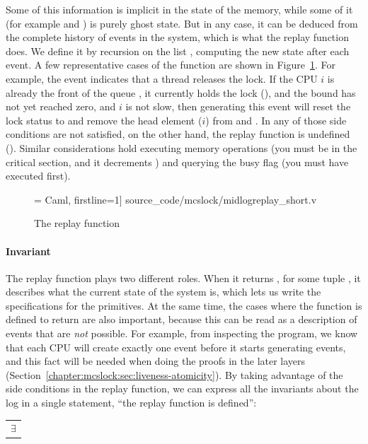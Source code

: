 Some of this information is implicit in the state of the memory, while some of it (for example  and ) is purely ghost state. But in any case, it can be deduced from the complete history of events in the system, which is what the replay function  does. We define it by recursion on the list , computing the new state after each event. A few representative cases of the function are shown in Figure~\ref{fig:chapter:mcslock:QS_CalLock}.  For example, the event
 indicates that a thread releases the lock. If the CPU $i$ is already the  front of the queue , it currently holds the lock (), and the bound  has not yet reached zero, and $i$ is not slow, then generating this event will reset the lock status to  and remove the head element ($i$) from  and . In any of those side conditions are not satisfied, on the other hand, the replay function is undefined (). Similar
considerations hold executing memory operations (you must be in the critical section, and it decrements ) and querying the busy flag (you must have executed  first).

\begin{figure}
 = Caml, firstline=1] {source_code/mcslock/midlogreplay_short.v}
    \caption{The replay function }
\label{fig:chapter:mcslock:QS_CalLock}
\end{figure}


\paragraph*{Invariant} The replay function plays two different roles. When it returns , for some tuple , it describes what the current state of the system is, which lets us write the specifications for the primitives. At the same time, the cases where the function is defined to return  are also important, because this can be read as a description of events that are \emph{not} possible. For example, from inspecting the program, we know that each CPU will create
exactly one  event before it starts generating  events, and this fact will be needed when doing the proofs in the later layers (Section~\ref{chapter:mcslock:sec:liveness-atomicity}). By taking advantage of  the side conditions in the replay function, we can express all the invariants about the log in a single statement, ``the replay function is defined'':\newline
\begin{tabular}{P{0.95\textwidth}}
    $\exists$ 
\end{tabular}

